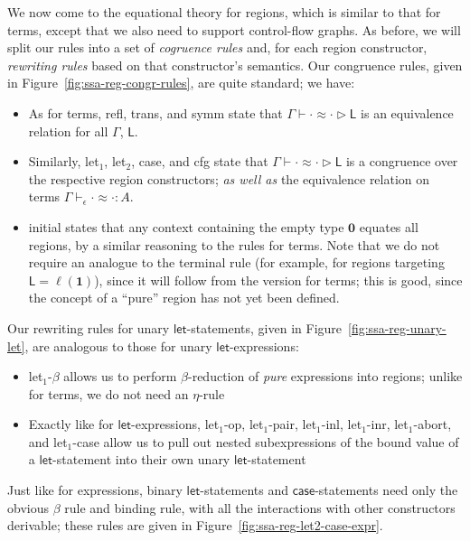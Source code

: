 \documentclass[acmsmall,screen,review]{acmart}
\newcommand{\mb}[1]{\ensuremath{\mathbf{#1}}}
\newcommand{\ms}[1]{\ensuremath{\mathsf{#1}}}
\newcommand{\lhyp}[2]{#1(#2)}
\newcommand{\teqv}{\approx}
\newcommand{\tmeq}[5]{#1 \vdash_{#2} #3 \teqv #4 : {#5}}
\newcommand{\lbeq}[4]{#1 \vdash #2 \teqv #3 \rhd {#4}}
\newcommand{\brle}[1]{{\scriptsize\textsf{#1}}}
\begin{document}
We now come to the equational theory for regions, which is similar to that for terms, except that we
also need to support control-flow graphs. As before, we will split our rules into a set of
\emph{cogruence rules} and, for each region constructor, \emph{rewriting rules} based on that
constructor's semantics. Our congruence rules, given in Figure~\ref{fig:ssa-reg-congr-rules}, are
quite standard; we have:
\begin{itemize}
  \item As for terms, \brle{refl}, \brle{trans}, and \brle{symm} state that
  $\lbeq{\Gamma}{\cdot}{\cdot}{\ms{L}}$ is an equivalence relation for all $\Gamma$, $\ms{L}$.
  \item Similarly, \brle{let$_1$}, \brle{let$_2$}, \brle{case}, and \brle{cfg} state that
  $\lbeq{\Gamma}{\cdot}{\cdot}{\ms{L}}$ is a congruence over the respective region constructors;
  \emph{as well as} the equivalence relation on terms $\tmeq{\Gamma}{\epsilon}{\cdot}{\cdot}{A}$.
  \item \brle{initial} states that any context containing the empty type $\mb{0}$ equates all
  regions, by a similar reasoning to the rules for terms. Note that we do not require an analogue to
  the \brle{terminal} rule (for example, for regions targeting $\ms{L} = \lhyp{\ell}{\mb{1}}$),
  since it will follow from the version for terms; this is good, since the concept of a ``pure''
  region has not yet been defined.
\end{itemize}
Our rewriting rules for unary \ms{let}-statements, given in Figure~\ref{fig:ssa-reg-unary-let}, are
analogous to those for unary \ms{let}-expressions:
\begin{itemize}
  \item \brle{let$_1$-$\beta$} allows us to perform $\beta$-reduction of \emph{pure} expressions
  into regions; unlike for terms, we do not need an $\eta$-rule
  \item Exactly like for \ms{let}-expressions, \brle{let$_1$-op}, \brle{let$_1$-pair},
  \brle{let$_1$-inl}, \brle{let$_1$-inr}, \brle{let$_1$-abort}, and \brle{let$_1$-case} allow us
  to pull out nested subexpressions of the bound value of a \ms{let}-statement into their own
  unary \ms{let}-statement
\end{itemize}
Just like for expressions, binary \ms{let}-statements and \ms{case}-statements need only the obvious
$\beta$ rule and binding rule, with all the interactions with other constructors derivable; these
rules are given in Figure~\ref{fig:ssa-reg-let2-case-expr}.
\end{document}
